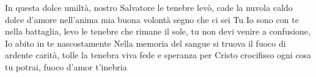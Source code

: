 \beginverse
In questa dolce umiltà, nostro Salvatore
le tenebre levò, cade la nuvola
caldo dolce d'amore nell'anima mia
buona volontà segno che ci sei Tu
\endverse
\beginchorus
Io sono con te nella battaglia,
levo le tenebre che rimane il sole,
tu non devi venire a confusione,
Io abito in te nascostamente
\endchorus
\beginverse
Nella memoria del sangue si truova il fuoco
di ardente carità, tolle la tenebra
viva fede e speranza per Cristo crocifisso
ogni cosa tu potrai, fuoco d'amor t'inebria
\endverse
\endsong
